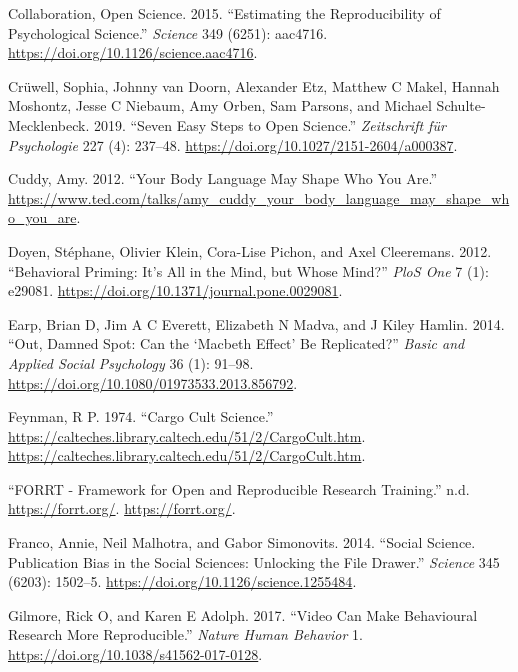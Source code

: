 \documentclass[
  letterpaper,
  DIV=11,
  numbers=noendperiod]{scrartcl}
\newlength{\cslhangindent}
\newenvironment{CSLReferences}[2] %
 {\begin{list}{}{%
  \setlength{\itemindent}{0pt}
  \setlength{\leftmargin}{0pt}
  \setlength{\parsep}{0pt}
  \ifodd #1
   \setlength{\leftmargin}{\cslhangindent}
   \setlength{\itemindent}{-1\cslhangindent}
  \fi
  \setlength{\itemsep}{#2\baselineskip}}}
 {\end{list}}
\begin{document}
\begin{CSLReferences}{1}{0}
Collaboration, Open Science. 2015. {``Estimating the Reproducibility of
Psychological Science.''} \emph{Science} 349 (6251): aac4716.
\url{https://doi.org/10.1126/science.aac4716}.

Crüwell, Sophia, Johnny van Doorn, Alexander Etz, Matthew C Makel,
Hannah Moshontz, Jesse C Niebaum, Amy Orben, Sam Parsons, and Michael
Schulte-Mecklenbeck. 2019. {``Seven Easy Steps to Open Science.''}
\emph{Zeitschrift f{ü}r Psychologie} 227 (4): 237--48.
\url{https://doi.org/10.1027/2151-2604/a000387}.

Cuddy, Amy. 2012. {``Your Body Language May Shape Who You Are.''}
\url{https://www.ted.com/talks/amy_cuddy_your_body_language_may_shape_who_you_are}.

Doyen, Stéphane, Olivier Klein, Cora-Lise Pichon, and Axel Cleeremans.
2012. {``Behavioral Priming: It's All in the Mind, but Whose Mind?''}
\emph{PloS One} 7 (1): e29081.
\url{https://doi.org/10.1371/journal.pone.0029081}.

Earp, Brian D, Jim A C Everett, Elizabeth N Madva, and J Kiley Hamlin.
2014. {``Out, Damned Spot: Can the {`{M}acbeth Effect'} Be
Replicated?''} \emph{Basic and Applied Social Psychology} 36 (1):
91--98. \url{https://doi.org/10.1080/01973533.2013.856792}.

Feynman, R P. 1974. {``Cargo Cult Science.''}
\url{https://calteches.library.caltech.edu/51/2/CargoCult.htm}.
\url{https://calteches.library.caltech.edu/51/2/CargoCult.htm}.

{``{FORRT} - Framework for Open and Reproducible Research Training.''}
n.d. \url{https://forrt.org/}. \url{https://forrt.org/}.

Franco, Annie, Neil Malhotra, and Gabor Simonovits. 2014. {``Social
Science. Publication Bias in the Social Sciences: Unlocking the File
Drawer.''} \emph{Science} 345 (6203): 1502--5.
\url{https://doi.org/10.1126/science.1255484}.

Gilmore, Rick O, and Karen E Adolph. 2017. {``Video Can Make Behavioural
Research More Reproducible.''} \emph{Nature Human Behavior} 1.
\url{https://doi.org/10.1038/s41562-017-0128}.


\end{CSLReferences}
\end{document}

